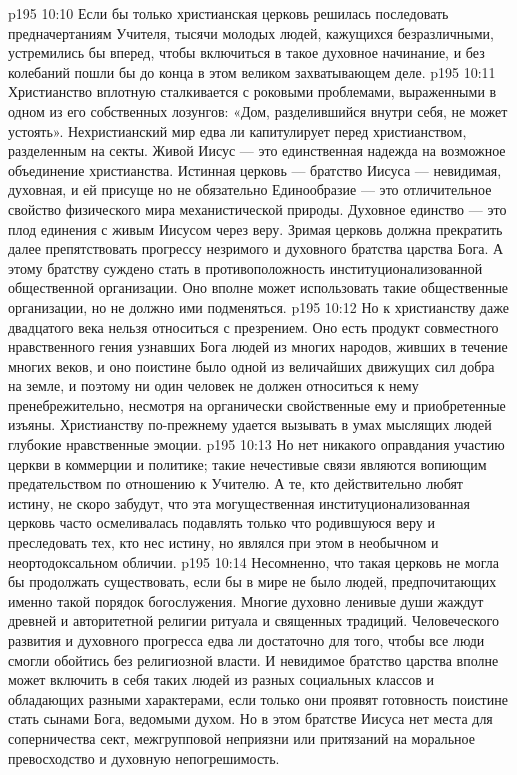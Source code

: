 \vs p195 10:10 Если бы только христианская церковь решилась последовать предначертаниям Учителя, тысячи молодых людей, кажущихся безразличными, устремились бы вперед, чтобы включиться в такое духовное начинание, и без колебаний пошли бы до конца в этом великом захватывающем деле.
\vs p195 10:11 Христианство вплотную сталкивается с роковыми проблемами, выраженными в одном из его собственных лозунгов: «Дом, разделившийся внутри себя, не может устоять». Нехристианский мир едва ли капитулирует перед христианством, разделенным на секты. Живой Иисус --- это единственная надежда на возможное объединение христианства. Истинная церковь --- братство Иисуса --- невидимая, духовная, и ей присуще  но не обязательно  Единообразие --- это отличительное свойство физического мира механистической природы. Духовное единство --- это плод единения с живым Иисусом через веру. Зримая церковь должна прекратить далее препятствовать прогрессу незримого и духовного братства царства Бога. А этому братству суждено стать  в противоположность институционализованной общественной организации. Оно вполне может использовать такие общественные организации, но не должно ими подменяться.
\vs p195 10:12 Но к христианству даже двадцатого века нельзя относиться с презрением. Оно есть продукт совместного нравственного гения узнавших Бога людей из многих народов, живших в течение многих веков, и оно поистине было одной из величайших движущих сил добра на земле, и поэтому ни один человек не должен относиться к нему пренебрежительно, несмотря на органически свойственные ему и приобретенные изъяны. Христианству по\hyp{}прежнему удается вызывать в умах мыслящих людей глубокие нравственные эмоции.
\vs p195 10:13 Но нет никакого оправдания участию церкви в коммерции и политике; такие нечестивые связи являются вопиющим предательством по отношению к Учителю. А те, кто действительно любят истину, не скоро забудут, что эта могущественная институционализованная церковь часто осмеливалась подавлять только что родившуюся веру и преследовать тех, кто нес истину, но являлся при этом в необычном и неортодоксальном обличии.
\vs p195 10:14 Несомненно, что такая церковь не могла бы продолжать существовать, если бы в мире не было людей, предпочитающих именно такой порядок богослужения. Многие духовно ленивые души жаждут древней и авторитетной религии ритуала и священных традиций. Человеческого развития и духовного прогресса едва ли достаточно для того, чтобы все люди смогли обойтись без религиозной власти. И невидимое братство царства вполне может включить в себя таких людей из разных социальных классов и обладающих разными характерами, если только они проявят готовность поистине стать сынами Бога, ведомыми духом. Но в этом братстве Иисуса нет места для соперничества сект, межгрупповой неприязни или притязаний на моральное превосходство и духовную непогрешимость.
